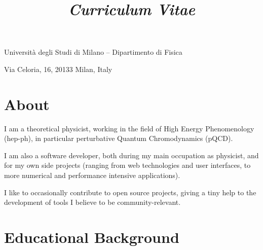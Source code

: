 \documentclass[10pt, a4paper, sans]{moderncv}
\title{\emph{Curriculum Vitae}}
\begin{document}
\makecvtitle

\vspace*{-15pt}
\begin{center}
    \color{gray}
    Università degli Studi di Milano – Dipartimento di Fisica

    Via Celoria, 16, 20133 Milan, Italy

    \emailsymbol {}
    \qquad
    \emailsymbol {}
\end{center}
\bigskip

\section{About}
I am a theoretical physicist, working in the field of High Energy Phenomenology
(hep-ph), in particular perturbative Quantum Chromodynamics (pQCD).\newline

I am also a software developer, both during my main occupation as physicist,
and for my own side projects (ranging from web technologies and user
interfaces, to more numerical and performance intensive applications).

I like to occasionally contribute to open source projects, giving a tiny help
to the development of tools I believe to be community-relevant.

\section{Educational Background}
\bigskip

\bigskip

\bigskip

\bigskip

\bigskip
\end{document}
